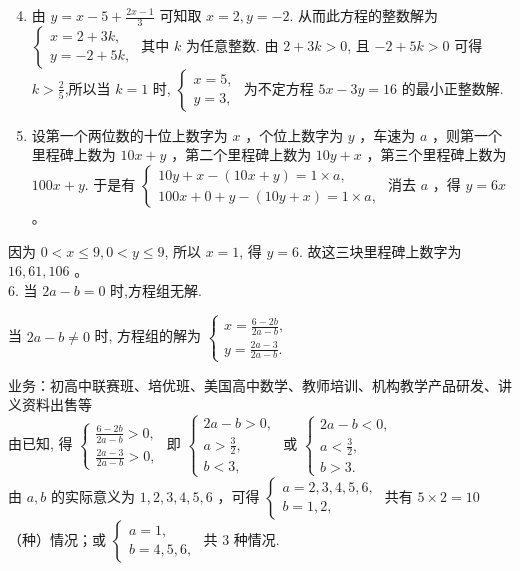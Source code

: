 \documentclass[10pt]{article}
\begin{document}
\begin{enumerate}
  \setcounter{enumi}{3}
  \item 由 $y=x-5+\frac{2 x-1}{3}$ 可知取 $x=2, y=-2$. 从而此方程的整数解为 $\left\{\begin{array}{l}x=2+3 k, \\ y=-2+5 k,\end{array}\right.$ 其中 $k$ 为任意整数. 由 $2+3 k>0$, 且 $-2+5 k>0$ 可得 $k>\frac{2}{5}$,所以当 $k=1$ 时, $\left\{\begin{array}{l}x=5, \\ y=3,\end{array}\right.$ 为不定方程 $5 x-3 y=16$ 的最小正整数解.
  \item 设第一个两位数的十位上数字为 $x$ ，个位上数字为 $y$ ，车速为 $a$ ，则第一个里程碑上数为 $10 x+y$ ，第二个里程碑上数为 $10 y+x$ ，第三个里程碑上数为 $100 x+y$. 于是有 $\left\{\begin{array}{l}10 y+x-(10 x+y)=1 \times a, \\ 100 x+0+y-(10 y+x)=1 \times a,\end{array}\right.$ 消去 $a$ ，得 $y=6 x$ 。
\end{enumerate}

因为 $0<x \leqslant 9,0<y \leqslant 9$, 所以 $x=1$, 得 $y=6$. 故这三块里程碑上数字为 $16,61,106$ 。\\
6. 当 $2 a-b=0$ 时,方程组无解.

当 $2 a-b \neq 0$ 时, 方程组的解为 $\left\{\begin{array}{l}x=\frac{6-2 b}{2 a-b}, \\ y=\frac{2 a-3}{2 a-b} .\end{array}\right.$

业务：初高中联赛班、培优班、美国高中数学、教师培训、机构教学产品研发、讲义资料出售等\\
由已知, 得 $\left\{\begin{array}{l}\frac{6-2 b}{2 a-b}>0, \\ \frac{2 a-3}{2 a-b}>0,\end{array}\right.$ 即 $\left\{\begin{array}{l}2 a-b>0, \\ a>\frac{3}{2}, \\ b<3,\end{array}\right.$ 或 $\left\{\begin{array}{l}2 a-b<0, \\ a<\frac{3}{2}, \\ b>3 .\end{array}\right.$\\
由 $a, b$ 的实际意义为 $1,2,3,4,5,6$ ，可得 $\left\{\begin{array}{l}a=2,3,4,5,6, \\ b=1,2,\end{array}\right.$ 共有 $5 \times 2=10$ （种）情况；或 $\left\{\begin{array}{l}a=1, \\ b=4,5,6,\end{array}\right.$ 共 3 种情况.
\end{document}
